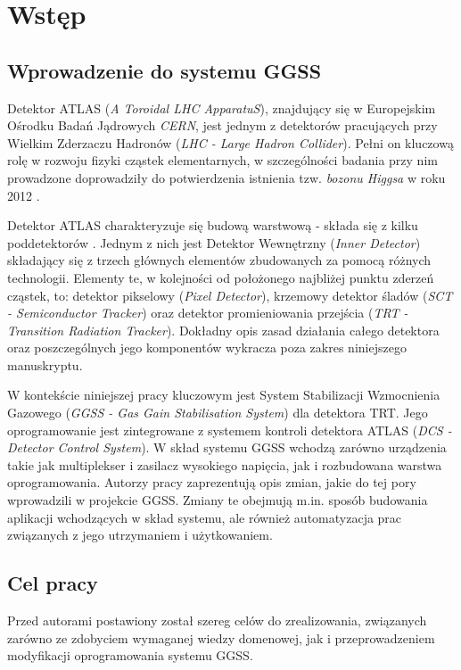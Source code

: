 \chapter{Wstęp}
\label{cha:wstep}

\section{Wprowadzenie do systemu GGSS}
Detektor ATLAS (\textit{A Toroidal LHC ApparatuS}), znajdujący się w Europejskim Ośrodku Badań Jądrowych \textit{CERN}, jest jednym z detektorów pracujących przy Wielkim Zderzaczu Hadronów (\textit{LHC - Large Hadron Collider}). Pełni on kluczową rolę w rozwoju fizyki cząstek elementarnych, w szczególności badania przy nim prowadzone doprowadziły do potwierdzenia istnienia tzw. \textit{bozonu Higgsa} w roku 2012 \cite{AtlasWikipedia}. \par

Detektor ATLAS charakteryzuje się budową warstwową - składa się z kilku poddetektorów \cite{AtlasAGH}. Jednym z nich jest Detektor Wewnętrzny (\textit{Inner Detector}) składający się z trzech głównych elementów zbudowanych za pomocą różnych technologii. Elementy te, w kolejności od położonego najbliżej punktu zderzeń cząstek, to: detektor pikselowy (\textit{Pixel Detector}), krzemowy detektor śladów (\textit{SCT - Semiconductor Tracker}) oraz detektor promieniowania przejścia (\textit{TRT - Transition Radiation Tracker}). Dokładny opis zasad działania całego detektora oraz poszczególnych jego komponentów wykracza poza zakres niniejszego manuskryptu.\par

W kontekście niniejszej pracy kluczowym jest System Stabilizacji Wzmocnienia Gazowego (\textit{GGSS - Gas Gain Stabilisation System}) dla detektora TRT. Jego oprogramowanie jest zintegrowane \cite{AtlasAGH} z systemem kontroli detektora ATLAS (\textit{DCS - Detector Control System}). W skład systemu GGSS wchodzą zarówno urządzenia takie jak multiplekser i zasilacz wysokiego napięcia, jak i rozbudowana warstwa oprogramowania. Autorzy pracy zaprezentują opis zmian, jakie do tej pory wprowadzili w projekcie GGSS. Zmiany te obejmują m.in. sposób budowania aplikacji wchodzących w skład systemu, ale również automatyzacja prac związanych z jego utrzymaniem i użytkowaniem.



\section{Cel pracy}
Przed autorami postawiony został szereg celów do zrealizowania, związanych zarówno ze zdobyciem wymaganej wiedzy domenowej, jak i przeprowadzeniem modyfikacji oprogramowania systemu GGSS. \par

